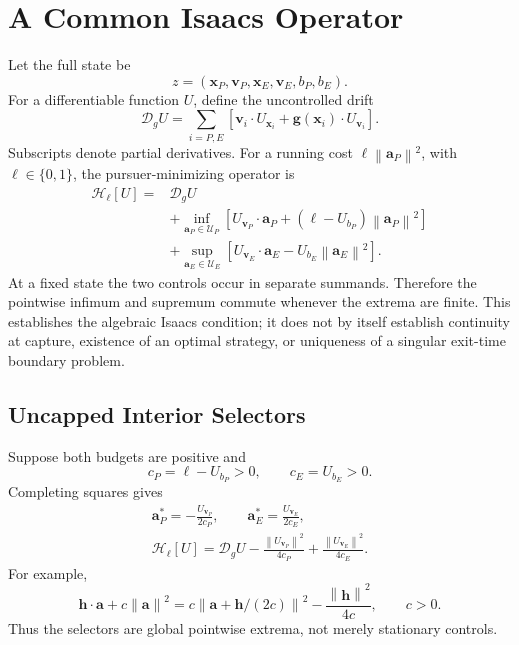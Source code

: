 \documentclass[journal,a4paper]{IEEEtran}
\newcommand{\U}{\mathcal U}
\newcommand{\D}{\mathcal D}
\newcommand{\HH}{\mathcal H}
\newcommand{\norm}[1]{\left\|#1\right\|}
\begin{document}
\section{A Common Isaacs Operator}
\label{sec:isaacs}
Let the full state be
\begin{equation}
 z=(\mathbf x_P,\mathbf v_P,\mathbf x_E,\mathbf v_E,b_P,b_E).
\end{equation}
For a differentiable function $U$, define the uncontrolled drift
\begin{equation}
 \D_g U=\sum_{i=P,E}
 \left[\mathbf v_i\cdot U_{\mathbf x_i}
       +\mathbf g(\mathbf x_i)\cdot U_{\mathbf v_i}\right].
 \label{eq:drift}
\end{equation}
Subscripts denote partial derivatives. For a running cost $\ell\norm{\mathbf a_P}^2$, with $\ell\in\{0,1\}$, the pursuer-minimizing operator is
\begin{align}
 \HH_\ell[U]={}&\D_g U\nonumber\\
 &+\inf_{\mathbf a_P\in\U_P}
 \left[U_{\mathbf v_P}\cdot\mathbf a_P
             +(\ell-U_{b_P})\norm{\mathbf a_P}^2\right]\nonumber\\
 &+\sup_{\mathbf a_E\in\U_E}
 \left[U_{\mathbf v_E}\cdot\mathbf a_E
                         -U_{b_E}\norm{\mathbf a_E}^2\right].
 \label{eq:Hgeneral}
\end{align}
At a fixed state the two controls occur in separate summands. Therefore the pointwise infimum and supremum commute whenever the extrema are finite. This establishes the algebraic Isaacs condition; it does not by itself establish continuity at capture, existence of an optimal strategy, or uniqueness of a singular exit-time boundary problem.

\subsection{Uncapped Interior Selectors}
Suppose both budgets are positive and
\begin{equation}
 c_P=\ell-U_{b_P}>0,\qquad c_E=U_{b_E}>0.
 \label{eq:coercivity}
\end{equation}
Completing squares gives
\begin{align}
 \boxed{\mathbf a_P^*=-\frac{U_{\mathbf v_P}}{2c_P},\qquad
        \mathbf a_E^*= \frac{U_{\mathbf v_E}}{2c_E},}
 \label{eq:feedbackfull}\\
 \boxed{\HH_\ell[U]=\D_g U
       -\frac{\norm{U_{\mathbf v_P}}^2}{4c_P}
       +\frac{\norm{U_{\mathbf v_E}}^2}{4c_E}.}
 \label{eq:Hquadratic}
\end{align}
For example,
\begin{equation}
 \mathbf h\cdot\mathbf a+c\norm{\mathbf a}^2
 =c\norm{\mathbf a+\mathbf h/(2c)}^2
  -\frac{\norm{\mathbf h}^2}{4c},\qquad c>0.
\end{equation}
Thus the selectors are global pointwise extrema, not merely stationary controls.
\end{document}
